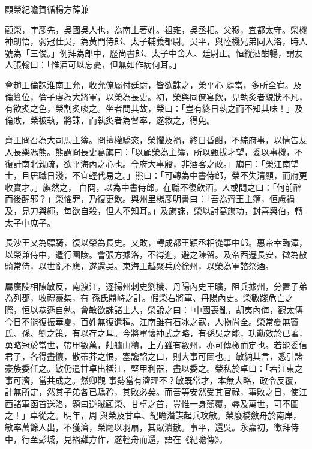 
\begin{pinyinscope}

 顧榮紀瞻賀循楊方薛兼



 顧榮，字彥先，吳國吳人也，為南土著姓。祖雍，吳丞相。父穆，宜都太守。榮機神朗悟，弱冠仕吳，為黃門侍郎、太子輔義都尉。吳平，與陸機兄弟同入洛，時人號為「三俊。」例拜為郎中，歷尚書郎、太子中舍人、廷尉正。恒縱酒酣暢，謂友人張翰曰：「惟酒可以忘憂，但無如作病何耳。」



 會趙王倫誅淮南王允，收允僚屬付廷尉，皆欲誅之，榮平心
 處當，多所全宥。及倫篡位，倫子虔為大將軍，以榮為長史。初，榮與同僚宴飲，見執炙者貌狀不凡，有欲炙之色，榮割炙啖之。坐者問其故，榮曰：「豈有終日執之而不知其味！」及倫敗，榮被執，將誅，而執炙者為督率，遂救之，得免。



 齊王冏召為大司馬主簿。冏擅權驕恣，榮懼及禍，終日昏酣，不綜府事，以情告友人長樂馮熊。熊謂冏長史葛旟曰：「以顧榮為主簿，所以甄拔才望，委以事機，不復計南北親疏，欲平海內之心也。今府大事殷，非酒客之政。」旟曰：「榮江南望士，且居職日淺，不宜輕代易之。」熊曰：「可轉為中書侍郎，榮不失清顯，而府更收實才。」旟然之，
 白冏，以為中書侍郎。在職不復飲酒。人或問之曰：「何前醉而後醒邪？」榮懼罪，乃復更飲。與州里楊彥明書曰：「吾為齊王主簿，恒慮禍及，見刀與繩，每欲自殺，但人不知耳。」及旟誅，榮以討葛旟功，封喜興伯，轉太子中庶子。



 長沙王乂為驃騎，復以榮為長史。乂敗，轉成都王穎丞相從事中郎。惠帝幸臨漳，以榮兼侍中，遣行園陵。會張方據洛，不得進，避之陳留。及帝西遷長安，徵為散騎常侍，以世亂不應，遂還吳。東海王越聚兵於徐州，以榮為軍諮祭酒。



 屬廣陵相陳敏反，南渡江，逐揚州刺史劉機、丹陽內史王曠，阻兵據州，分置子弟為列郡，收禮豪桀，有
 孫氏鼎峙之計。假榮右將軍、丹陽內史。榮數踐危亡之際，恒以恭遜自勉。會敏欲誅諸士人，榮說之曰：「中國喪亂，胡夷內侮，觀太傅今日不能復振華夏，百姓無復遺種。江南雖有石冰之寇，人物尚全。榮常憂無竇氏、孫、劉之策，有以存之耳。今將軍懷神武之略，有孫吳之能，功勳效於已著，勇略冠於當世，帶甲數萬，舳艫山積，上方雖有數州，亦可傳檄而定也。若能委信君子，各得盡懷，散蒂芥之恨，塞讒諂之口，則大事可圖也。」敏納其言，悉引諸豪族委任之。敏仍遣甘卓出橫江，堅甲利器，盡以委之。榮私於卓曰：「若江東之事可濟，當共成之。然卿觀
 事勢當有濟理不？敏既常才，本無大略，政令反覆，計無所定，然其子弟各已驕矜，其敗必矣。而吾等安然受其官祿，事敗之日，使江西諸軍函首送洛，題曰逆賊顧榮、甘卓之首，豈惟一身顛覆，辱及萬世，可不圖之！」卓從之。明年，周與榮及甘卓、紀瞻潛謀起兵攻敏。榮廢橋斂舟於南岸，敏率萬餘人出，不獲濟，榮麾以羽扇，其眾潰散。事平，還吳。永嘉初，徵拜侍中，行至彭城，見禍難方作，遂輕舟而還，語在《紀瞻傳》。




\end{pinyinscope}
